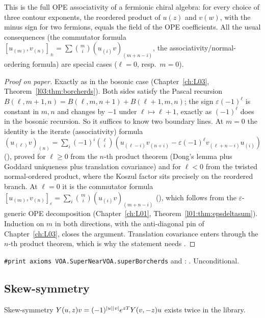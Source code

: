 \begin{physics}
This is the full OPE associativity of a fermionic chiral algebra: for every choice of three contour
exponents, the reordered product of $u(z)$ and $v(w)$, with the minus sign for two fermions, equals
the field of the OPE coefficients. All the usual consequences (the commutator formula
$[u_{(m)},v_{(n)}]_\pm=\sum\binom mi(u_{(i)}v)_{(m+n-i)}$, the associativity/normal-ordering formula)
are special cases ($\ell=0$, resp.\ $m=0$).
\end{physics}
\begin{proof}[Proof on paper]
Exactly as in the bosonic case (Chapter~\ref{ch:L03}, Theorem~\ref{l03:thm:borcherds}). Both sides
satisfy the Pascal recursion $B(\ell,m+1,n)=B(\ell,m,n+1)+B(\ell+1,m,n)$; the sign
$\varepsilon(-1)^\ell$ is constant in $m,n$ and changes by $-1$ under $\ell\mapsto\ell+1$, exactly as
$(-1)^\ell$ does in the bosonic recursion. So it suffices to know two boundary lines. At $m=0$ the
identity is the iterate (associativity) formula
$(u_{(\ell)}v)_{(n)}=\sum_i(-1)^i\binom\ell i(u_{(\ell-i)}v_{(n+i)}-\varepsilon(-1)^\ell v_{(\ell+n-i)}u_{(i)})$
(), proved for $\ell\ge0$ from the $n$-th product theorem (Dong's lemma plus
Goddard uniqueness plus translation covariance) and for $\ell<0$ from the twisted normal-ordered
product, where the Koszul factor sits precisely on the reordered branch. At $\ell=0$ it is the
commutator formula $[u_{(m)},v_{(n)}]_\varepsilon=\sum_i\binom mi(u_{(i)}v)_{(m+n-i)}$
(), which follows from the $\varepsilon$-generic OPE decomposition
(Chapter~\ref{ch:L01}, Theorem~\ref{l01:thm:epsdeltasum}). Induction on $m$ in both directions, with
the anti-diagonal pin of Chapter~\ref{ch:L03}, closes the argument. Translation covariance enters
through the $n$-th product theorem, which is why the statement needs .
\end{proof}
\begin{status}
\texttt{\#print axioms VOA.SuperNearVOA.superBorcherds} and :
. Unconditional.
\end{status}

\subsection{Skew-symmetry}

Skew-symmetry $Y(u,z)v=(-1)^{|u||v|}e^{zT}Y(v,-z)u$ exists twice in the
library.


